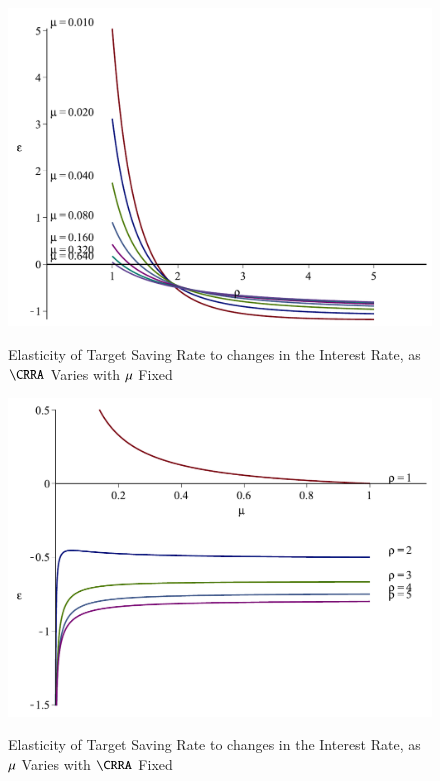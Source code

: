 \documentclass[titlepage,abstract]{\econtex}\newcommand{\texname}{ctDiscrete}
\begin{document}
\begin{figure}%
\caption{Elasticity of Target Saving Rate to changes in the Interest Rate, as $\CRRA$ Varies with $\mu$ Fixed}%
\medskip%
\includegraphics{./Figures/sElasticityUrateFixedCRRAVaries_4}%
\label{fig:sElasticityUrateFixedCRRAVaries}%
\end{figure}

\begin{figure}%
\caption{Elasticity of Target Saving Rate to changes in the Interest Rate, as $\mu$ Varies with $\CRRA$ Fixed}%
\medskip%
\includegraphics{./Figures/sElasticityCRRAFixedUrateVaries_4}%
\label{fig:sElasticityCRRAFixedUrateVaries}%
\end{figure}
\end{document}
